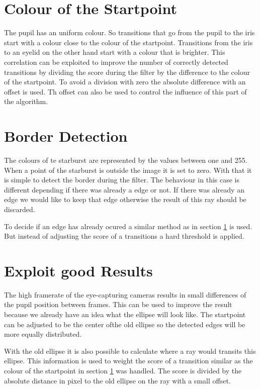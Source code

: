 \section{Colour of the Startpoint}
\label{sec:colorStartpoint}
The pupil has an uniform colour. So transitions that go from the pupil to the iris start with a colour close to the colour of the startpoint. Transitions from the iris to an eyelid on the other hand start with a colour that is brighter. This correlation can be exploited to improve the number of correctly detected transitions by dividing the score during the filter by the difference to the colour of the startpoint. To avoid a division with zero the absolute difference with an offset is used. Th offset can also be used to control the influence of this part of the algorithm.  
\section{Border Detection}
\label{sec:randdetektion}
The colours of te starburst are represented by the values between one and 255. When a point of the starburst is outside the image it is set to zero. With that it is simple to detect the border during the filter. The behaviour in this case is different depending if there was already a edge or not. If there was already an edge we would like to keep that edge otherwise the result of this ray should be discarded. 

To decide if an edge has already ocured a similar method as in section \ref{sec:colorStartpoint} is used. But instead of adjusting the score of a transitions a hard threshold is applied. 
\section{Exploit good Results}
\label{sec:goodResults}

The high framerate of the eye-capturing cameras results in small differences of the pupil position between frames. This can be used to improve the result because we already have an idea what the ellipse will look like. The startpoint can be adjusted to be the center ofthe old ellipse so the detected edges will be more equally distributed.

With the old ellipse it is also possible to calculate where a ray would transits this ellipse. This information is used to weight the score of a transition similar as the colour of the startpoint in section \ref{sec:colorStartpoint} was handled. The score is divided by the absolute distance in pixel to the old ellipse on the ray with a small offset.
